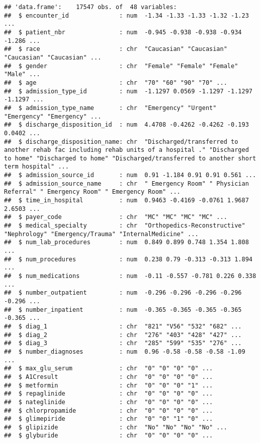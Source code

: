 \documentclass[
]{article}
\begin{document}
\begin{verbatim}
## 'data.frame':    17547 obs. of  48 variables:
##  $ encounter_id              : num  -1.34 -1.33 -1.33 -1.32 -1.23 ...
##  $ patient_nbr               : num  -0.945 -0.938 -0.938 -0.934 -1.286 ...
##  $ race                      : chr  "Caucasian" "Caucasian" "Caucasian" "Caucasian" ...
##  $ gender                    : chr  "Female" "Female" "Female" "Male" ...
##  $ age                       : chr  "70" "60" "90" "70" ...
##  $ admission_type_id         : num  -1.1297 0.0569 -1.1297 -1.1297 -1.1297 ...
##  $ admission_type_name       : chr  "Emergency" "Urgent" "Emergency" "Emergency" ...
##  $ discharge_disposition_id  : num  4.4708 -0.4262 -0.4262 -0.193 0.0402 ...
##  $ discharge_disposition_name: chr  "Discharged/transferred to another rehab fac including rehab units of a hospital ." "Discharged to home" "Discharged to home" "Discharged/transferred to another short term hospital" ...
##  $ admission_source_id       : num  0.91 -1.184 0.91 0.91 0.561 ...
##  $ admission_source_name     : chr  " Emergency Room" " Physician Referral" " Emergency Room" " Emergency Room" ...
##  $ time_in_hospital          : num  0.9463 -0.4169 -0.0761 1.9687 2.6503 ...
##  $ payer_code                : chr  "MC" "MC" "MC" "MC" ...
##  $ medical_specialty         : chr  "Orthopedics-Reconstructive" "Nephrology" "Emergency/Trauma" "InternalMedicine" ...
##  $ num_lab_procedures        : num  0.849 0.899 0.748 1.354 1.808 ...
##  $ num_procedures            : num  0.238 0.79 -0.313 -0.313 1.894 ...
##  $ num_medications           : num  -0.11 -0.557 -0.781 0.226 0.338 ...
##  $ number_outpatient         : num  -0.296 -0.296 -0.296 -0.296 -0.296 ...
##  $ number_inpatient          : num  -0.365 -0.365 -0.365 -0.365 -0.365 ...
##  $ diag_1                    : chr  "821" "V56" "532" "682" ...
##  $ diag_2                    : chr  "276" "403" "428" "427" ...
##  $ diag_3                    : chr  "285" "599" "535" "276" ...
##  $ number_diagnoses          : num  0.96 -0.58 -0.58 -0.58 -1.09 ...
##  $ max_glu_serum             : chr  "0" "0" "0" "0" ...
##  $ A1Cresult                 : chr  "0" "0" "0" "0" ...
##  $ metformin                 : chr  "0" "0" "0" "1" ...
##  $ repaglinide               : chr  "0" "0" "0" "0" ...
##  $ nateglinide               : chr  "0" "0" "0" "0" ...
##  $ chlorpropamide            : chr  "0" "0" "0" "0" ...
##  $ glimepiride               : chr  "0" "0" "1" "0" ...
##  $ glipizide                 : chr  "No" "No" "No" "No" ...
##  $ glyburide                 : chr  "0" "0" "0" "0" ...

\end{verbatim}
\end{document}
